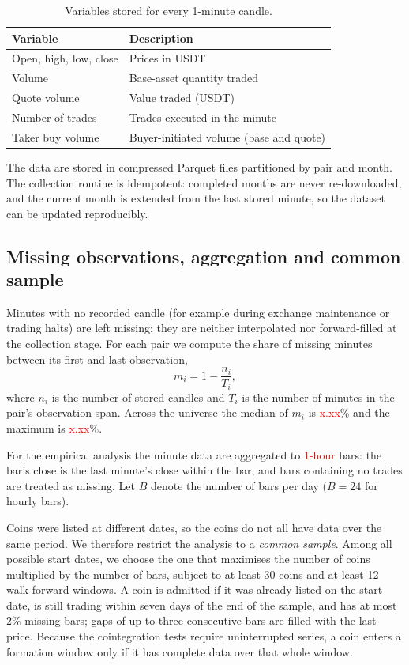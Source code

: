 \documentclass[10pt,a4paper,twocolumn]{article}
\newcommand{\TBD}[1]{\textcolor{red}{#1}}
\begin{document}
	\begin{table}[htbp]
		\centering
		\small
		\caption{Variables stored for every 1-minute candle.}
		\label{tab:fields}
		\begin{tabularx}{\columnwidth}{@{}lX@{}}
			\toprule
			Variable & Description \\
			\midrule
			Open, high, low, close & Prices in USDT \\
			Volume & Base-asset quantity traded \\
			Quote volume & Value traded (USDT) \\
			Number of trades & Trades executed in the minute \\
			Taker buy volume & Buyer-initiated volume (base and quote) \\
			\bottomrule
		\end{tabularx}
	\end{table}
	
	The data are stored in compressed Parquet files partitioned by pair and month. The collection routine is idempotent: completed months are never re-downloaded, and the current month is extended from the last stored minute, so the dataset can be updated reproducibly.
	
	\subsection{Missing observations, aggregation and common sample}
	\label{sec:common}
	Minutes with no recorded candle (for example during exchange maintenance or trading halts) are left missing; they are neither interpolated nor forward-filled at the collection stage. For each pair we compute the share of missing minutes between its first and last observation,
	\begin{equation}
		m_i = 1 - \frac{n_i}{T_i},
	\end{equation}
	where $n_i$ is the number of stored candles and $T_i$ is the number of minutes in the pair's observation span. Across the universe the median of $m_i$ is \TBD{x.xx}\% and the maximum is \TBD{x.xx}\%.
	
	For the empirical analysis the minute data are aggregated to \TBD{1-hour} bars: the bar's close is the last minute's close within the bar, and bars containing no trades are treated as missing. Let $B$ denote the number of bars per day ($B=24$ for hourly bars).
	
	Coins were listed at different dates, so the coins do not all have data over the same period. We therefore restrict the analysis to a \emph{common sample}. Among all possible start dates, we choose the one that maximises the number of coins multiplied by the number of bars, subject to at least 30 coins and at least 12 walk-forward windows. A coin is admitted if it was already listed on the start date, is still trading within seven days of the end of the sample, and has at most 2\% missing bars; gaps of up to three consecutive bars are filled with the last price. Because the cointegration tests require uninterrupted series, a coin enters a formation window only if it has complete data over that whole window.
	
\end{document}
